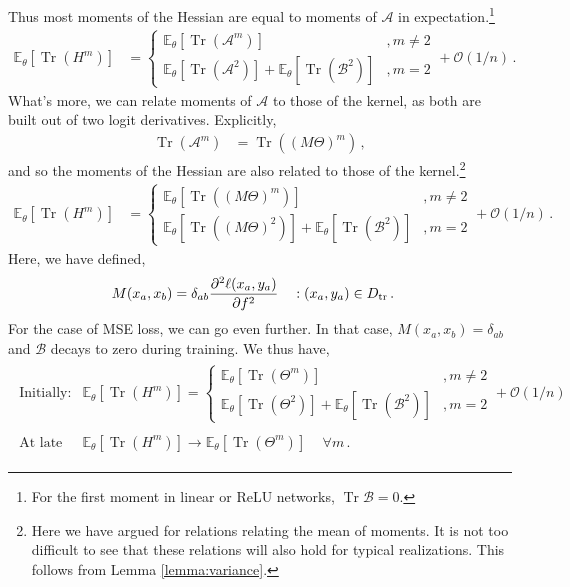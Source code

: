 \documentclass[english]{article}
\newcommand{\es}[2] {\begin{align} \label{#1} #2 \end{align}}
\DeclareMathOperator{\trace}{Tr}
\newcommand{\lexpp}[1]{\mathbb{E}_{#1}\left[}
\newcommand{\rexp}{\right]}
\begin{document}
Thus most moments of the Hessian are equal to moments of $\mathcal{A}$ in expectation.\footnote{For the first moment in linear or ReLU networks, $\trace{\mathcal{B}}=0$.}
\es{hessArel}{
\lexpp{\theta}\trace\left(H^{m}\right)\rexp&=
\left\{\begin{array}{ll}
\lexpp{\theta}\trace\left(\mathcal{A}^{m}\right)\rexp&, m\neq 2\\
\lexpp{\theta}\trace\left(\mathcal{A}^{2}\right)\rexp + \lexpp{\theta}\trace\left(\mathcal{B}^{2}\right)\rexp&, m=2
\end{array}\right.+\mathcal{O}(1/n)\,.
}
What's more, we can relate moments of $\mathcal{A}$ to those of the kernel, as both are built out of two logit derivatives. 
Explicitly,
\es{AThetaRel}{
\trace(\mathcal{A}^{m})&=\trace((M\Theta)^{m})\,,
}
and so the moments of the Hessian are also related to those of the kernel.\footnote{Here we have argued for relations relating the mean of moments. It is not too difficult to see that these relations will also hold for typical realizations. This follows from Lemma \ref{lemma:variance}.
}
\es{hessThetarel}{
\lexpp{\theta}\trace\left(H^{m}\right)\rexp&=
\left\{\begin{array}{ll}
\lexpp{\theta}\trace\left((M\Theta)^{m}\right)\rexp&,m\neq 2\\
\lexpp{\theta}\trace\left((M\Theta)^{2}\right)\rexp + \lexpp{\theta}\trace\left(\mathcal{B}^{2}\right)\rexp&, m=2
\end{array}\right.+\mathcal{O}(1/n)\,.
}
Here, we have defined,
\es{Mdef}{
M(x_{a},x_{b})&=\delta_{ab}\frac{\partial^{2}\ell(x_a,y_a)}{\partial f^{2}}\ \ \ :(x_a,y_a)\in D_{\rm tr}\,.
}
For the case of MSE loss, we can go even further. In that case, $M(x_{a},x_{b})=\delta_{ab}$ and $\mathcal{B}$ decays to zero during training. We thus have,
\es{hessArelMSE}{
\begin{array}{ll}
\textrm{Initially:} & \lexpp{\theta}\trace\left(H^{m}\right)\rexp =
\left\{\begin{array}{ll}
\lexpp{\theta}\trace\left(\Theta^{m}\right)\rexp&, m\neq 2\\
\lexpp{\theta}\trace\left(\Theta^{2}\right)\rexp + \lexpp{\theta}\trace\left(\mathcal{B}^{2}\right)\rexp&, m=2
\end{array}\right.+\mathcal{O}(1/n)\\
\,\\
\textrm{At late times:} &  \lexpp{\theta}\trace\left(H^{m}\right)\rexp \to \lexpp{\theta}\trace\left(\Theta^{m}\right)\rexp\,\quad \forall m\,.
\end{array}
}
\end{document}
